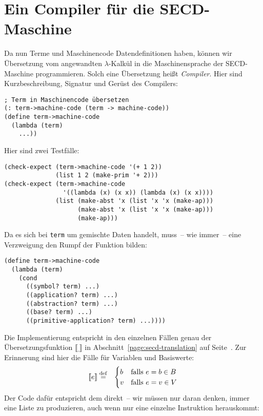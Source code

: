 \section{Ein Compiler für die SECD-Maschine}

Da nun Terme und Maschinencode Datendefinitionen
haben, können wir Übersetzung vom angewandten
$\lambda$-Kalkül in die Maschinensprache der SECD-Maschine
programmieren.  Solch eine Übersetzung heißt \textit{Compiler}.
Hier sind Kurzbeschreibung, Signatur und Gerüst des Compilers:
%
\begin{lstlisting}
; Term in Maschinencode übersetzen
(: term->machine-code (term -> machine-code))
(define term->machine-code
  (lambda (term)
    ...))
\end{lstlisting}
%
Hier sind zwei Testfälle:
%
\begin{lstlisting}
(check-expect (term->machine-code '(+ 1 2))
              (list 1 2 (make-prim '+ 2)))
(check-expect (term->machine-code 
                '((lambda (x) (x x)) (lambda (x) (x x))))
              (list (make-abst 'x (list 'x 'x (make-ap)))
                    (make-abst 'x (list 'x 'x (make-ap)))
                    (make-ap)))
\end{lstlisting}
%
Da es sich bei \lstinline{term} um gemischte Daten handelt, muss~-- wie
immer~-- eine Verzweigung den Rumpf der Funktion bilden:
%
\begin{lstlisting}
(define term->machine-code
  (lambda (term)
    (cond
      ((symbol? term) ...)
      ((application? term) ...)
      ((abstraction? term) ...)
      ((base? term) ...)
      ((primitive-application? term) ...))))
\end{lstlisting}
%
Die Implementierung entspricht in den einzelnen Fällen genau der
Übersetzungsfunktion $\llbracket\underline{~}\rrbracket$ in
Abschnitt~\ref{page:secd-translation} auf
Seite~\pageref{page:secd-translation}. Zur Erinnerung sind hier die Fälle für Variablen und
Basiswerte:
\begin{eqnarray*}
    \llbracket e \rrbracket &\stackrel{\rm def}{=}&
  \begin{cases}
    b & \textrm{falls $e = b \in B$}\\
    v & \textrm{falls $e = v \in V$}\\
  \end{cases}
\end{eqnarray*}
%
Der Code dafür entspricht dem direkt~-- wir müssen nur daran denken,
immer eine Liste zu produzieren, auch wenn nur eine einzelne
Instruktion herauskommt:
